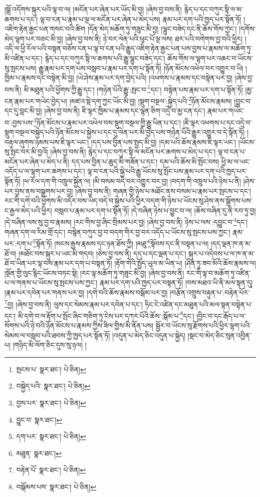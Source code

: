 །སྒྲོ་འདོགས་སྐུར་པའི་ལྟ་བ་ལ། །མངོན་པར་ཞེན་པར་ཡོད་མི་བྱ། །ཞེས་བྱ་བས་ནི། རྙེད་པ་དང་བཀུར་སྟི་ལ་མ་ཆགས་པ་དང་། ལྟ་བ་ངན་པ་རྣམ་པ་ལྔ་ལ་མངོན་པར་ཞེན་པ་མེད་པས། རྣམ་པར་དག་པའི་ཁྱད་པར་སྟོན་ཏོ། །
འཇིག་རྟེན་རྒྱང་པན་གསང་བའི་ཚིག །དོན་མེད་མཆོག་ཏུ་གཟུང་མི་བྱ། །ལྷུང་བཟེད་དང་ནི་ཆོས་གོས་ཀྱང་། །དགོས་མེད་ལྷག་པར་བཅང་མི་བྱ། །ཞེས་བྱ་བས་ནི། ཉེ་བར་ལེན་པའི་ཕུང་པོ་ལྔ་ལས། ཐར་པའི་བགེགས་བྱ་བའི་ཕྱིར། །འདི་ལ་ཕྱི་རོལ་པའི་བསྟན་བཅོས་ངན་པ་ལྟ་བ་ངན་པའི་རྒྱུད་འཇིག་རྟེན་རྒྱང་པན་པས་བྱས་པ་རྣམས་ལ་མཆོག་ཏུ་མི་འཛིན་པ་དང་། རྙེད་པ་དང་བཀུར་སྟི་ལ་ཆགས་པའི་རྒྱུ་ལྷུང་བཟེད་དང་། ཆོས་གོས་ལ་ལྷག་པར་འཆང་བ་ཡོངས་སུ་སྤངས་པས། རྒྱུ་རྣམ་པར་དག་པས་བསླབ་པ་རྣམ་པར་དག་པ་སྟོན་ཏོ། །ཉོན་མོངས་འཕེལ་བར་འགྱུར་བ་ཡི། །ཁྱིམ་པ་རྣམས་དང་བསྟེན་མི་བྱ། །ཡེ་ཤེས་རྣམ་པར་དག་བྱེད་པའི། །འཕགས་པ་རྣམས་དང་བསྟེན་པར་བྱ། །ཞེས་བྱ་བས་ནི། མི་མཐུན་པའི་ཕྱོགས་ཀྱི་རྒྱུ་དང་། །གཉེན་པོའི་རྒྱུ་:སྤང་བ་\footnote{སྤངས་པ་  སྣར་ཐང་།  པེ་ཅིན། }དང་། བསྟེན་པས་རྣམ་པར་དག་པ་སྟོན་ཏོ། །མྱ་ངན་རྣམ་པར་གཡེང་བྱེད་པ། །མཛའ་སྡེ་དག་ཀྱང་ཡོང་མི་བྱ། །སྡུག་བསྔལ་:སྐྱེད་པའི་\footnote{བསྐྱེད་པའི་  སྣར་ཐང་།  པེ་ཅིན། }ཉོན་མོངས་རྣམས། །བྱུང་བ་དང་དུ་བླང་མི་བྱ། །ཞེས་བྱ་བས་ནི། ཇི་ལྟར་ཁྱིམ་པ་རྣམས་དང་ལྷན་ཅིག་འདྲེ་བ་མྱ་ངན་དང་། རྣམ་པར་གཡེང་བ་:བྱས་པས་\footnote{བྱས་པར་  སྣར་ཐང་།  པེ་ཅིན། }ཉོན་མོངས་པ་རྣམ་པར་འཕེལ་བས་སྡུག་བསྔལ་གྱི་རྒྱུ་ཡིན་པ་དང་། །ཇི་ལྟར་འཕགས་པ་དང་འདྲེ་བ་སྡུག་བསྔལ་བསྐྱེད་པའི་ཉོན་མོངས་པ་སྐྱེས་པ་དང་དུ་ལེན་པར་མི་བྱེད་པས་གཉེན་པོའི་རྒྱུར་འགྱུར་བ་དེ་སྟོན་ཏོ། །བརྟུལ་ཞུགས་ཉམས་པས་ཇི་ལྟར་ཡང་། །དད་པས་བྱིན་པས་སྤྱད་མི་བྱ། །དམ་པའི་ཆོས་རྣམས་ཇི་ལྟར་ཡང་། །ཡོངས་སུ་སྤང་བར་མི་བྱའོ། །ཞེས་བྱ་བས་ནི། རྙེད་པ་དང་བཀུར་སྟི་ལ་མངོན་པར་ཆགས་པ་མེད་པ་དང་། ལྟ་བ་ངན་པ་མངོན་པར་ཞེན་པ་མེད་པ་ནི། དད་པས་བྱིན་པ་ཆུད་མི་གཟོན་པ་དང་། དམ་པའི་ཆོས་མི་སྤོང་བས། ཕྱི་མ་ལ་ཡང་འདོད་པ་ལ་ལྷག་པར་ཆགས་པ་དང་། ལྟ་བ་ངན་པའི་སྐྱེ་པའི་རྒྱུ་ཡོངས་སུ་སྤོང་པས་རྣམ་པར་དག་པའི་ཁྱད་པར་སྟོན་ཏོ། །ཕ་རོལ་དག་གི་འཁྲུལ་སྐྱོན་ལ། །མི་བསམ་བདེ་བར་འགྱུར་བར་བྱ། །བདག་གི་འཁྲུལ་པའི་ཉེས་པ་ནི། །ཤེས་པར་བྱས་ནས་བསྒྲགས་པར་བྱ། །ཞེས་བྱ་བས་ནི། གཞན་གྱི་ཉེས་པ་མཐོང་ནས་བསམ་པ་རྣམ་པར་སྤངས་པ་དང་། རང་གི་དགེ་བའི་ཕྱོགས་མི་འདོར་བས་ཡིད་བདེ་བ་སྐྱེས་པའི་ཕྱིར་བདག་གི་ཉེས་པ་ཡོངས་སུ་ཤེས་ནས་སྒྲོགས་པས་ང་རྒྱལ་མེད་པའི་ཕྱིར། བསླབ་པ་རྣམ་པར་དག་པ་སྟོན་ཏོ། །དེ་བཞིན་ཉེས་པ་བྱུང་བ་ལ། །ཆོས་བཞིན་དུ་ནི་རབ་ཏུ་བྱ། །དེ་བཞིན་ལས་སུ་བྱ་བ་རྣམས། །རང་གིས་བྱ་ཞིང་གྲིམས་པར་བྱ། །ཞེས་བྱ་བས་ནི། ཉེས་པ་ལས་:དབྱུང་བ་\footnote{བྱུང་བ་  སྣར་ཐང་། }དང་། གཞན་དག་ལ་རིམ་གྲོ་དང་། བསྙེན་བཀུར་བྱ་བ་བདག་གིར་བྱ་བར་འདོད་པ་ཡོངས་སུ་སྤངས་པས་ཀྱང་། རྣམ་པར་:དག་པ་\footnote{དག་པར་  སྣར་ཐང་།  པེ་ཅིན། }སྟོན་ཏོ། །སངས་རྒྱས་རྣམས་དང་ཉན་ཐོས་ཀྱི། །མཐུ་\footnote{མཐུན་  སྣར་ཐང་། }སྟོབས་དང་ནི་བསྟན་པ་ལ། །དད་ལྡན་ཁ་ན་མ་ཐོ་བ། །མཐོང་བས་སྐུར་པ་ཡང་མི་གདབ། །ཅེས་བྱ་བས་ནི། དད་པ་དང་ལྡན་པ་དང་། སྐུར་པ་འདེབས་པ་ལ་ཁ་ན་མ་ཐོ་བ་ཡིན་པར་ལྟ་བས་རྣམ་པར་དག་པ་བསྟན་ཏོ། །རྟོག་གེའི་སྤྱོད་ཡུལ་མ་ཡིན་པ། །ཤིན་ཏུ་ཟབ་མོའི་ཆོས་རྣམས་ལ། །སྔོན་གྱི་ལུང་རྙིང་ཡོངས་བཏང་སྟེ། །རང་ལྟ་མཆོག་ཏུ་གཟུང་མི་བྱ། །ཞེས་བྱ་བས་ནི། རང་གི་ལྟ་བ་མཆོག་ཏུ་འཛིན་པ་ལ་གནས་པ་ཡོངས་སུ་སྤངས་པས་ཀྱང་། རྣམ་པར་དག་པའི་ཁྱད་པར་བསྟན་ཏོ། །བས་མཐའ་ཡི་ནི་མལ་སྟན་དུ། །རྣམ་པར་དབེན་པར་གནས་པར་བྱ། །དགེ་བའི་ཆོས་རྣམས་བསྒོམ་པར་བྱ། །བརྩོན་འགྲུས་བརྟུན་པ་:བརྟེན་པོར་\footnote{བརྟེན་པོ་  སྣར་ཐང་།  པེ་ཅིན། }བྱ། །ཞེས་བྱ་བས་ནི། ལུས་དང་སེམས་རྣམ་པར་དབེན་པ་དང་། ཏིང་ངེ་འཛིན་དང་མཐུན་པའི་མལ་སྟན་བསྟེན་པ་དང་། མི་དགེ་བ་ལ་རྟོག་པ་སྤོང་ཞིང་གཅིག་ཏུ་ངེས་པར་དཀར་པོའི་ཆོས་:སྒོམ་པ་\footnote{བསྒོམས་པས་  སྣར་ཐང་།  པེ་ཅིན། }དང་། །བྱིང་བ་དང་རྒོད་པ་ལ་སོགས་པའི་ཉེ་བའི་ཉོན་མོངས་པ་རྣམས་ཀྱིས་ཟིལ་གྱིས་མི་ནོན་པས། སྦྱོར་བ་ཡོངས་སུ་རྫོགས་པའི་ཕྱིར་ལྷག་པའི་སེམས་ལ་བསླབ་པའི་ཐབས་ཀྱི་ཁྱད་པར་སྟོན་ཏོ། །འདུན་པ་མེད་ཅིང་འདུན་པ་སྐྱེད། །སྡང་བ་མེད་ཅིང་སུན་འབྱིན་པ། །གཉིད་མི་ལོག་ཅིང་དུས་སུ་ཉལ། །
